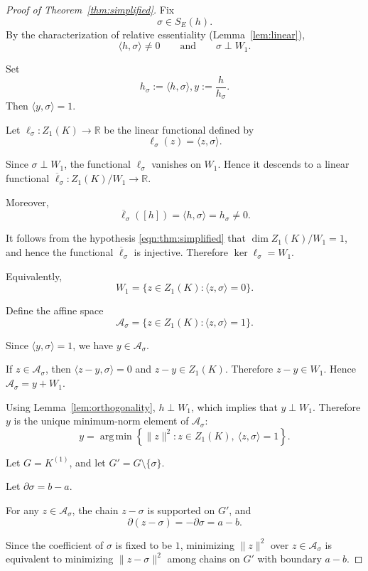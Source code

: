 \documentclass[10pt,a4paper]{amsart}
\newcommand{\R}{\mathbb{R}}
\newcommand{\argmin}{\operatorname*{arg\,min}}
\begin{document}
\begin{proof}[Proof of Theorem~\ref{thm:simplified}]
Fix
\[
\sigma\in S_E(h).
\]
By the characterization of relative essentiality (Lemma~\ref{lem:linear}),
\[
\langle h,\sigma\rangle\neq 0
\qquad\text{and}\qquad
\sigma\perp W_1.
\]

Set
\[
h_\sigma:=\langle h,\sigma\rangle,
y:=\frac{h}{h_\sigma}.
\]
Then
$
\langle y,\sigma\rangle=1
$.

Let
$
\ell_\sigma:Z_1(K)\to\R
$
be the linear functional defined by 
\[
\ell_\sigma(z)=\langle z,\sigma\rangle.
\]

Since
$
\sigma\perp W_1
$,
the functional \(\ell_\sigma\) vanishes on \(W_1\). Hence it descends to a
linear functional
$
\overline{\ell}_\sigma:
Z_1(K)/W_1
\to
\R
$.


Moreover,
\[
\overline{\ell}_\sigma([h])
=
\langle h,\sigma\rangle
=
h_\sigma
\neq 0.
\]

It follows from the hypothesis \eqref{eqn:thm:simplified} that
$
\dim Z_1(K)/W_1=1
$,
and hence 
the functional \(\overline{\ell}_\sigma\) is injective. Therefore
$
\ker\ell_\sigma=W_1.
$

Equivalently,
\[
W_1
=
\{z\in Z_1(K):\langle z,\sigma\rangle=0\}.
\]

Define the affine space
\[
\mathcal A_\sigma
=
\{z\in Z_1(K):\langle z,\sigma\rangle=1\}.
\]

Since
$
\langle y,\sigma\rangle=1
$,
we have
$
y\in\mathcal A_\sigma.
$

If
$
z\in\mathcal A_\sigma
$,
then
$
\langle z-y,\sigma\rangle=0
$
and
$
z-y\in Z_1(K)
$.
Therefore
$
z-y\in W_1
$.
Hence
$
\mathcal A_\sigma=y+W_1
$.

Using Lemma~\ref{lem:orthogonality},
$
h\perp W_1
$,
which implies that 
$
y\perp W_1
$.
Therefore \(y\) is the unique minimum-norm element of \(\mathcal A_\sigma\):
\[
y
=
\argmin
\left\{
\|z\|^2:
z\in Z_1(K),\ \langle z,\sigma\rangle=1
\right\}.
\]

Let
$
G=K^{(1)}
$,
and let
$
G'=G\setminus\{\sigma\}
$.

Let
$
\partial\sigma=b-a
$.

For any
$
z\in\mathcal A_\sigma
$,
the chain
$
z-\sigma
$
is supported on \(G'\), and
\[
\partial(z-\sigma)
=
-\partial\sigma
=
a-b.
\]

Since the coefficient of \(\sigma\) is fixed to be \(1\), minimizing
$
\|z\|^2
$
over \(z\in\mathcal A_\sigma\) is equivalent to minimizing
$
\|z-\sigma\|^2
$
among chains on \(G'\) with boundary \(a-b\).


\end{proof}
\end{document}
